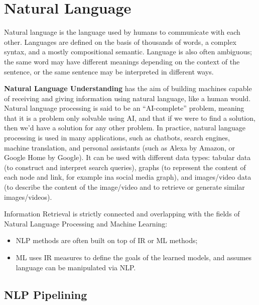 \chapter{Natural Language}

Natural language is the language used by humans to communicate with each other. Languages are defined on the basis of thousands of words, a complex syntax, and a mostly compositional semantic. Language is also often ambiguous; the same word may have different meanings depending on the context of the sentence, or the same sentence may be interpreted in different ways.

\textbf{Natural Language Understanding} has the aim of building machines capable of receiving and giving information using natural language, like a human would. Natural language processing is said to be an ``AI-complete'' problem, meaning that it is a problem only solvable using AI, and that if we were to find a solution, then we'd have a solution for any other problem. In practice, natural language processing is used in many applications, such as chatbots, search engines, machine translation, and personal assistants (such as Alexa by Amazon, or Google Home by Google). It can be used with different data types: tabular data (to construct and interpret search queries), graphs (to represent the content of each node and link, for example ina social media graph), and images/video data (to describe the content of the image/video and to retrieve or generate similar images/videos).

Information Retrieval is strictly connected and overlapping with the fields of Natural Language Processing and Machine Learning:
\begin{itemize}
    \item NLP methods are often built on top of IR or ML methods;
    \item ML uses IR measures to define the goals of the learned models, and assumes language can be manipulated via NLP.
\end{itemize}

\section{NLP Pipelining}

